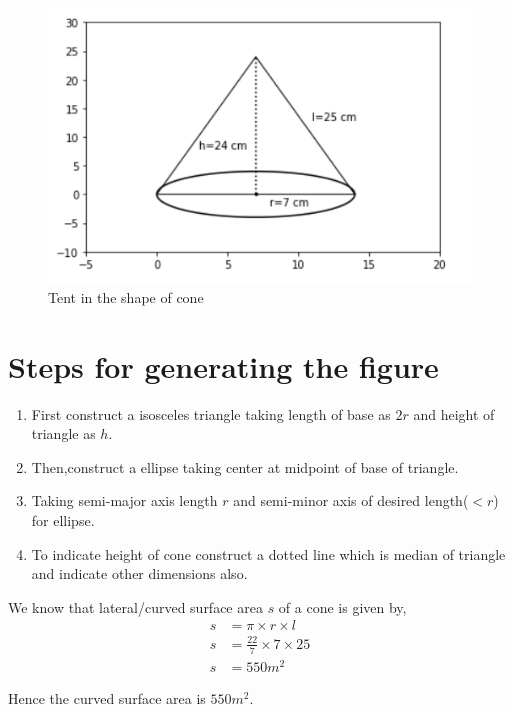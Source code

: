 \documentclass[article,12pt,twocolumn]{IEEEtran}
\begin{document}
  \begin{figure}[h!]
	  \centering 
	  \includegraphics[width=\columnwidth]{./Figs/cone.png}
	  \caption{Tent in the shape of cone}
	  \label{Fig1}
  \end{figure}
  
  \section*{Steps for generating the figure}
   \begin{enumerate}
     \item First construct a isosceles triangle taking length of base as $2r$ and height of triangle as $h$.
     \item Then,construct a ellipse taking center at midpoint of base of triangle.
     \item Taking semi-major axis length $r$ and semi-minor axis of desired length($<r$) for ellipse.
     \item To indicate height of cone construct a dotted line which is median of triangle and indicate other dimensions also.
   \end{enumerate} 
  
  We know that lateral/curved surface area $s$ of a cone is given
  by,
  \begin{align}
     s &= \pi \times r \times l 
     \\
     s &= \frac{22}{7} \times 7 \times 25  
     \\
     s &= 550 m^2 
  \end{align}
   
  Hence the curved surface area is $ 550 m^2 $. \\\\
 
 
\end{document}
